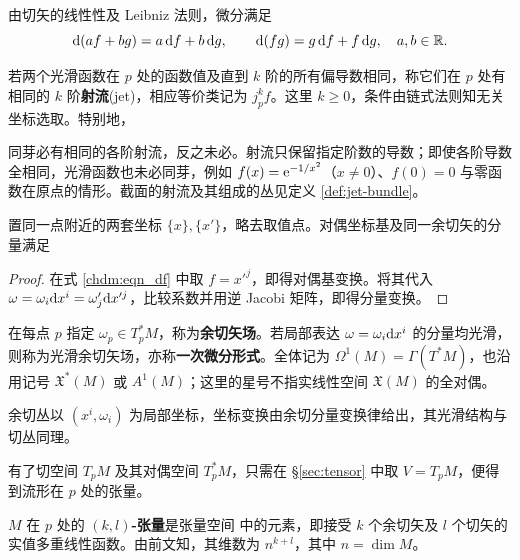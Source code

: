 由切矢的线性性及 Leibniz 法则，微分满足
\[
    \dd(af+bg)=a\,\dd f+b\,\dd g,\qquad
    \dd(fg)=g\,\dd f+f\,\dd g,\quad a,b\in\mathbb{R}.
\]

\begin{definition}\label{def:function-jet}
    若两个光滑函数在 $p$ 处的函数值及直到 $k$ 阶的所有偏导数相同，称它们在 $p$ 处有相同的 $k$ 阶\textbf{射流}(jet)，相应等价类记为 $j_p^kf$。这里 $k\geqslant0$，条件由链式法则知无关坐标选取。特别地，
\end{definition}

同芽必有相同的各阶射流，反之未必。射流只保留指定阶数的导数；即使各阶导数全相同，光滑函数也未必同芽，例如 $f(x)=\mathrm{e}^{-1/x^2}$（$x\ne0$）、$f(0)=0$ 与零函数在原点的情形。截面的射流及其组成的丛见定义 \ref{def:jet-bundle}。

\begin{theorem}[余切分量变换律]
    置同一点附近的两套坐标 $\{x\},\{x'\}$，略去取值点。对偶坐标基及同一余切矢的分量满足
\end{theorem}
\begin{proof}
    在式 \eqref{chdm:eqn_df} 中取 $f=x'^j$，即得对偶基变换。将其代入 $\omega=\omega_i\dd x^i=\omega'_j\dd x'^j$，比较系数并用逆 Jacobi 矩阵，即得分量变换。
\end{proof}

\begin{definition}
    在每点 $p$ 指定 $\omega_p\in T_p^*M$，称为\textbf{余切矢场}。若局部表达 $\omega=\omega_i\dd x^i$ 的分量均光滑，则称为光滑余切矢场，亦称\textbf{一次微分形式}。全体记为 $\Omega^1(M)=\Gamma(T^*M)$，也沿用记号 $\mathfrak X^*(M)$ 或 $A^1(M)$；这里的星号不指实线性空间 $\mathfrak X(M)$ 的全对偶。
\end{definition}

余切丛以 $(x^i,\omega_i)$ 为局部坐标，坐标变换由余切分量变换律给出，其光滑结构与切丛同理。

有了切空间 $T_pM$ 及其对偶空间 $T_p^*M$，只需在 \S\ref{sec:tensor} 中取 $V=T_pM$，便得到流形在 $p$ 处的张量。

\begin{definition}
    $M$ 在 $p$ 处的 \textbf{$(k,l)$-张量}是张量空间
    中的元素，即接受 $k$ 个余切矢及 $l$ 个切矢的实值多重线性函数。由前文知，其维数为 $n^{k+l}$，其中 $n=\dim M$。
\end{definition}


